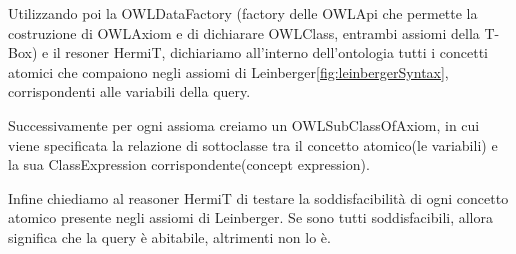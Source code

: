 Utilizzando poi la OWLDataFactory (factory delle OWLApi che permette la costruzione di OWLAxiom e di dichiarare OWLClass, entrambi assiomi della T-Box) e il resoner HermiT\cite{HermiT}, dichiariamo all'interno dell'ontologia tutti i concetti atomici che compaiono negli assiomi di Leinberger\ref{fig:leinbergerSyntax}, corrispondenti alle variabili della query.

Successivamente per ogni assioma creiamo un OWLSubClassOfAxiom, in cui viene specificata la relazione di sottoclasse tra il concetto atomico(le variabili) e la sua ClassExpression corrispondente(concept expression).

Infine chiediamo al reasoner HermiT di testare la soddisfacibilità di ogni concetto atomico presente negli assiomi di Leinberger. Se sono tutti soddisfacibili, allora significa che la query è abitabile, altrimenti non lo è.

\newpage
